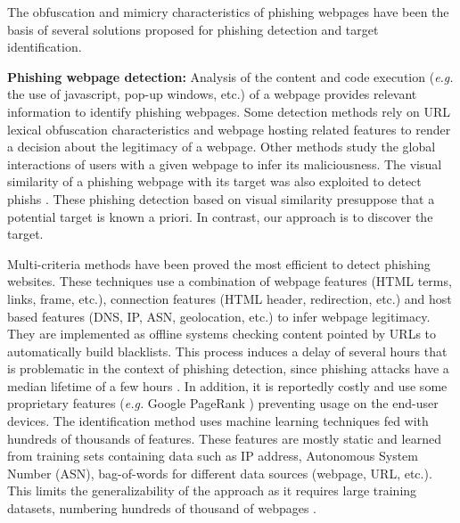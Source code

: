 \documentclass[10pt,conference,compsocconf,letterpaper]{IEEEtran}
\begin{document}
The obfuscation and mimicry characteristics of phishing webpages have been the basis of several solutions proposed for phishing detection and target identification.

\textbf{Phishing webpage detection:}
Analysis of the content \cite{Xiang:2009:hybrid,zhang:2007:cantina} and code execution (\textit{e.g.} the use of javascript, pop-up windows, etc.) \cite{corbetta:2014:eyes,Mohammad:2014:predicting} of a webpage provides relevant information to identify phishing webpages. Some detection methods rely on URL lexical obfuscation characteristics \cite{Blum:2010:lexical,le:2011:phishdef,marchal:2014:phishstorm} and webpage hosting related features \cite{Feroz:2014:examination,Ma:2009:beyond,Ma:2009:identifying} to render a decision about the legitimacy of a webpage. Other methods \cite{stringhini:2013:shady} study the global interactions of users with a given webpage to infer its maliciousness.
The visual similarity of a phishing webpage with its target was also exploited to detect phishs \cite{Chen:2010:detecting,Chen:2014:anti,Medvet:2008:visual}.
These phishing detection based on visual similarity presuppose that a potential target is known a priori. In contrast, our approach is to discover the target. 

Multi-criteria methods \cite{Ma:2009:identifying,thomas:2011:design,whittaker:2010:large} have been proved the most efficient to detect phishing websites.
These techniques use a combination of webpage features (HTML terms, links, frame, etc.), connection features (HTML header, redirection, etc.) and host based features (DNS, IP, ASN, geolocation, etc.) to infer webpage legitimacy. They are implemented as offline systems checking content pointed by URLs to automatically build blacklists. This process induces a delay of several hours \cite{whittaker:2010:large} that is problematic in the context of phishing detection, since phishing attacks have a median lifetime of a few hours \cite{apwg:2015}. In addition, it is reportedly costly \cite{thomas:2011:design} and use \cite{whittaker:2010:large} some proprietary features (\textit{e.g.} Google PageRank \cite{page:1999:pagerank}) preventing usage on the end-user devices. The identification method uses machine learning techniques fed with hundreds of thousands of features. These features are mostly static and learned from training sets containing data such as IP address, Autonomous System Number (ASN), bag-of-words for different data sources (webpage, URL, etc.).
This limits the generalizability of the approach as it requires large training datasets, numbering hundreds of thousand of webpages \cite{thomas:2011:design,whittaker:2010:large}.
 
\end{document}
